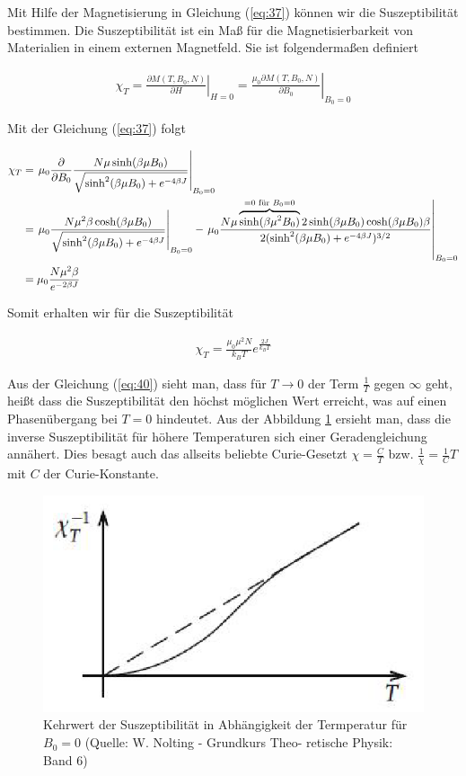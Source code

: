 Mit Hilfe der Magnetisierung in Gleichung (\ref{eq:37}) können wir die Suszeptibilität bestimmen. Die Suszeptibilität ist ein Maß für die Magnetisierbarkeit von Materialien in einem externen Magnetfeld. Sie ist folgendermaßen definiert

\begin{align}
  \label{eq:38}
  \chi_T = \left. \frac{\partial M(T,B_0,N)}{\partial H}\right|_{H=0} = \left. \frac{\mu_0 \partial M(T,B_0,N)}{\partial B_0}\right|_{B_0=0}
\end{align}

Mit der Gleichung (\ref{eq:37}) folgt

\begin{align}
  \label{eq:39}
  \chi_T &= \left. \mu_0 \pdiff_{B_0}  \frac{ N \mu \sinh(\beta \mu B_0)}{\sqrt{\sinh^2(\beta \mu B_0) + e^{-4\beta J}   }}  \right|_{B_0=0} \notag\\
&= \left. \mu_0 \frac{ N \mu^2 \beta \cosh(\beta \mu B_0)}{\sqrt{\sinh^2(\beta \mu B_0) + e^{-4\beta J}   }}  \right|_{B_0=0} -  \left. \mu_0 \frac{ N \mu \overbr{\sinh(\beta \mu^2 B_0)}^{=0 \text{ für }B_0=0}2\sinh(\beta \mu B_0)\cosh(\beta \mu B_0)\beta }{2(\sinh^2(\beta \mu B_0) + e^{-4\beta J}   )^{3/2}}  \right|_{B_0=0}  \notag\\
&=  \mu_0 \frac{ N \mu^2 \beta }{e^{-2\beta J}  } 
\end{align}

Somit erhalten wir für die Suszeptibilität

\begin{align}
  \label{eq:40}
 \boxed{ \chi_T = \frac{ \mu_0 \mu^2 N }{k_B T}e^{ \frac{2J}{k_B T}} }
\end{align}

Aus der Gleichung (\ref{eq:40}) sieht man, dass für \(T\to 0\) der Term \(\frac{1}{T}\) gegen \(\infty\) geht, heißt dass die Suszeptibilität den höchst möglichen Wert erreicht, was auf einen Phasenübergang bei \(T=0\) hindeutet. Aus der Abbildung \ref{fig:3} ersieht man, dass die inverse Suszeptibilität für höhere Temperaturen sich einer Geradengleichung annähert. Dies besagt auch das allseits beliebte Curie-Gesetzt \(\chi=\frac{C}{T}\) bzw. \(\frac{1}{\chi}=\frac{1}{C}T\) mit \(C\) der Curie-Konstante.

\begin{figure}[t]
  \centering
  \includegraphics[scale=0.5]{./ising-pics/ising03.png}
  \caption{Kehrwert der Suszeptibilität in Abhängigkeit der Termperatur für \(B_0=0\)  (Quelle: W. Nolting - Grundkurs Theo-
retische Physik: Band 6)
}
  \label{fig:3}
\end{figure}





